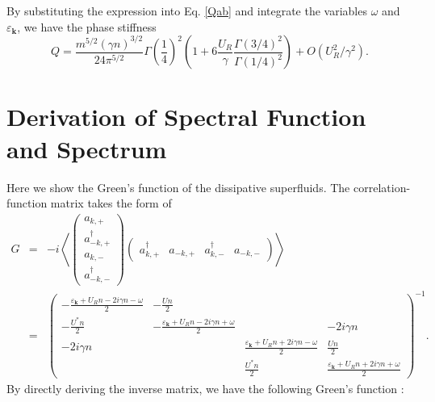 \documentclass[aps,superscriptaddress,notitlepage,longbibliography]{revtex4-1}
\begin{document}
By substituting the expression into Eq. \eqref{Qab} and integrate
the variables $\omega$ and $\varepsilon_{\bm{k}}$, we have the phase
stiffness 
\begin{equation}
Q=\frac{m^{5/2}(\gamma n)^{3/2}}{24\pi^{5/2}}\Gamma\left(\frac{1}{4}\right)^{2}\left(1+6\frac{U_{R}}{\gamma}\frac{\Gamma(3/4)^{2}}{\Gamma(1/4)^{2}}\right)+O(U_{R}^{2}/\gamma^{2}).
\end{equation}


\section{Derivation of Spectral Function and Spectrum}

Here we show the Green's function of the dissipative superfluids.
The correlation-function matrix takes the form of 
\begin{eqnarray}
G & = & -i\left\langle \left(\begin{array}{c}
a_{k\bm{,+}}\\
a_{-k\bm{,+}}^{\dagger}\\
a_{k,-}\\
a_{-k,-}^{\dagger}
\end{array}\right)\left(\begin{array}{cccc}
a_{k,+}^{\dagger} & a_{-k,+} & a_{k,-}^{\dagger} & a_{-k,-}\end{array}\right)\right\rangle \nonumber \\
 & = & \left(\begin{array}{cccc}
-\frac{\varepsilon_{\bm{k}}+U_{R}n-2i\gamma n-\omega}{2} & -\frac{Un}{2}\\
-\frac{U^{\ast}n}{2} & -\frac{\varepsilon_{\bm{k}}+U_{R}n-2i\gamma n+\omega}{2} &  & -2i\gamma n\\
-2i\gamma n &  & \frac{\varepsilon_{\bm{k}}+U_{R}n+2i\gamma n-\omega}{2} & \frac{Un}{2}\\
 &  & \frac{U^{\ast}n}{2} & \frac{\varepsilon_{\bm{k}}+U_{R}n+2i\gamma n+\omega}{2}
\end{array}\right)^{-1}.
\end{eqnarray}
By directly deriving the inverse matrix, we have the following Green's
function \citep{Kamenev_2011}: 
\end{document}
